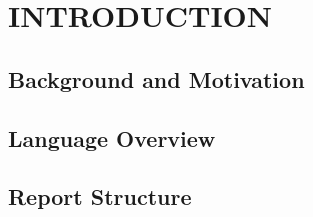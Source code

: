 \chapter{INTRODUCTION}

\section{Background and Motivation}

\section{Language Overview}

\section{Report Structure}
